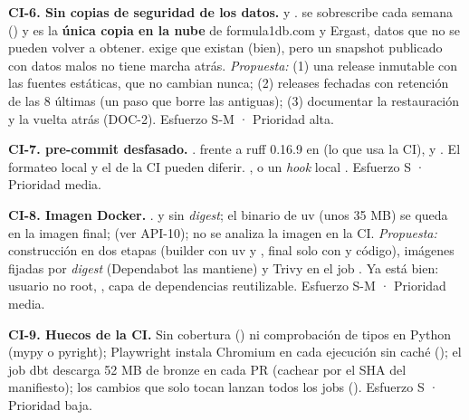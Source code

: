 \textbf{CI-6. Sin copias de seguridad de los datos.}  y .  se sobrescribe cada semana () y  es la \textbf{única copia en la nube} de formula1db.com y Ergast, datos que no se pueden volver a obtener.  exige que existan (bien), pero un snapshot publicado con datos malos no tiene marcha atrás. \emph{Propuesta:} (1) una release inmutable  con las fuentes estáticas, que no cambian nunca; (2) releases fechadas con retención de las 8 últimas (un paso que borre las antiguas); (3) documentar la restauración y la vuelta atrás (DOC-2). Esfuerzo S-M · Prioridad alta.

\textbf{CI-7. pre-commit desfasado.} .  frente a ruff 0.16.9 en  (lo que usa la CI), y . El formateo local y el de la CI pueden diferir. , o un \emph{hook} local . Esfuerzo S · Prioridad media.

\textbf{CI-8. Imagen Docker.} .  y  sin \emph{digest}; el binario de uv (unos 35 MB) se queda en la imagen final;  (ver API-10); no se analiza la imagen en la CI. \emph{Propuesta:} construcción en dos etapas (builder con uv y , final solo con  y código), imágenes fijadas por \emph{digest} (Dependabot las mantiene) y Trivy en el job . Ya está bien: usuario no root, , capa de dependencias reutilizable. Esfuerzo S-M · Prioridad media.

\textbf{CI-9. Huecos de la CI.} Sin cobertura () ni comprobación de tipos en Python (mypy o pyright); Playwright instala Chromium en cada ejecución sin caché (); el job dbt descarga 52 MB de bronze en cada PR (cachear por el SHA del manifiesto); los cambios que solo tocan  lanzan todos los jobs (). Esfuerzo S · Prioridad baja.

